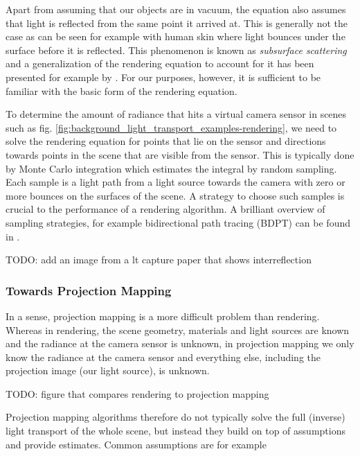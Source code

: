 Apart from assuming that our objects are in vacuum, the equation also assumes that light is reflected from the same point it arrived at. This is generally not the case as can be seen for example with human skin where light bounces under the surface before it is reflected. This phenomenon is known as \textit{subsurface scattering} and a generalization of the rendering equation to account for it has been presented for example by \citet{Jensen2001}. For our purposes, however, it is sufficient to be familiar with the basic form of the rendering equation.

To determine the amount of radiance that hits a virtual camera sensor in scenes such as fig. \ref{fig:background_light_transport_examples-rendering}, we need to solve the rendering equation for points that lie on the sensor and directions towards points in the scene that are visible from the sensor. This is typically done by Monte Carlo integration which estimates the integral by random sampling. Each sample is a light path from a light source towards the camera with zero or more bounces on the surfaces of the scene. A strategy to choose such samples is crucial to the performance of a rendering algorithm. A brilliant overview of sampling strategies, for example bidirectional path tracing (BDPT) can be found in \citet{Veach1997}.

{\color{red} TODO: add an image from a lt capture paper that shows interreflection}

\subsubsection{Towards Projection Mapping}
\label{section:background-projection_mapping-light_transport-towards_projection_mapping}

In a sense, projection mapping is a more difficult problem than rendering. Whereas in rendering, the scene geometry, materials and light sources are known and the radiance at the camera sensor is unknown, in projection mapping we only know the radiance at the camera sensor and everything else, including the projection image (our light source), is unknown.

{\color{red} TODO: figure that compares rendering to projection mapping}

Projection mapping algorithms therefore do not typically solve the full (inverse) light transport of the whole scene, but instead they build on top of assumptions and provide estimates. Common assumptions are for example

